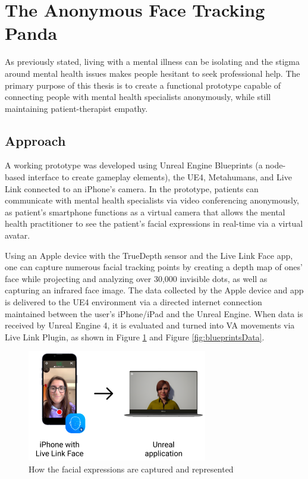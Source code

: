 \section{The Anonymous Face Tracking Panda}
As previously stated, living with a mental illness can be isolating and the stigma around mental health issues makes people hesitant to seek professional help. The primary purpose of this thesis is to create a functional prototype capable of connecting people with mental health specialists anonymously, while still maintaining patient-therapist empathy.

\subsection{Approach}
A working prototype was developed using Unreal Engine Blueprints (a node-based interface to create gameplay elements), the UE4, Metahumans, and Live Link connected to an iPhone's camera. In the prototype, patients can communicate with mental health specialists via video conferencing anonymously, as patient's smartphone functions as a virtual camera that allows the mental health practitioner to see the patient's facial expressions in real-time via a virtual avatar.

Using an Apple device with the TrueDepth sensor and the Live Link Face app, one can capture numerous facial tracking points by creating a depth map of ones’ face while projecting and analyzing over 30,000 invisible dots, as well as capturing an infrared face image. The data collected by the Apple device and app is delivered to the UE4 environment via a directed internet connection maintained between the user's iPhone/iPad and the Unreal Engine. When data is received by Unreal Engine 4, it is evaluated and turned into VA movements via Live Link Plugin, as shown in Figure \ref{fig:facialExpressions} and Figure \ref{fig:blueprintsData}.

\begin{figure}[!htb]
\includegraphics[width=0.7\textwidth]{figures/howItWorks.png}
\centering
\caption{How the facial expressions are captured and represented}
\label{fig:facialExpressions}
\end{figure}

